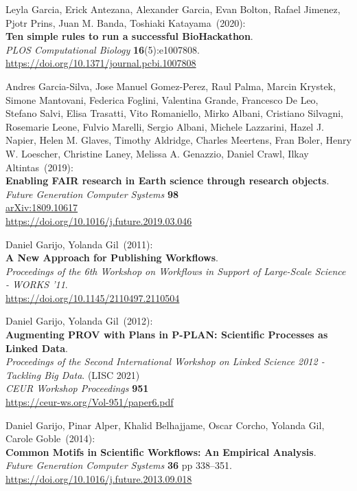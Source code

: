 \begin{thebibliography}{9}
Leyla Garcia, Erick Antezana, Alexander Garcia, Evan Bolton, Rafael Jimenez, Pjotr Prins, Juan M. Banda, Toshiaki Katayama~(2020): \\
\textbf{Ten simple rules to run a successful BioHackathon}. \\
\emph{PLOS Computational Biology} \textbf{16}(5):e1007808.\\
\url{https://doi.org/10.1371/journal.pcbi.1007808}

Andres Garcia-Silva, Jose Manuel Gomez-Perez, Raul Palma, Marcin Krystek, Simone Mantovani, Federica Foglini, Valentina Grande, Francesco De Leo, Stefano Salvi, Elisa Trasatti, Vito Romaniello, Mirko Albani, Cristiano Silvagni, Rosemarie Leone, Fulvio Marelli, Sergio Albani, Michele Lazzarini, Hazel J. Napier, Helen M. Glaves, Timothy Aldridge, Charles Meertens, Fran Boler, Henry W. Loescher, Christine Laney, Melissa A. Genazzio, Daniel Crawl, Ilkay Altintas~(2019): \\
\textbf{Enabling FAIR research in Earth science through research objects}.\\
\emph{Future Generation Computer Systems} \textbf{98} \\
\href{https://doi.org/10.48550/arXiv.1809.10617}{arXiv:1809.10617} \\
\url{https://doi.org/10.1016/j.future.2019.03.046}

Daniel Garijo, Yolanda Gil~(2011): \\
\textbf{A New Approach for Publishing Workflows}.\\
\emph{Proceedings of the 6th Workshop on Workflows in Support of Large-Scale Science - WORKS '11}.\\
\url{https://doi.org/10.1145/2110497.2110504}

 Daniel Garijo, Yolanda Gil~(2012): \\
\textbf{Augmenting PROV with Plans in P-PLAN: Scientific Processes as Linked Data}.\\
\emph{Proceedings of the Second International Workshop on Linked Science 2012 - Tackling Big Data}. (LISC 2021)\\
\emph{CEUR Workshop Proceedings} \textbf{951}\\
\url{https://ceur-ws.org/Vol-951/paper6.pdf}

Daniel Garijo, Pinar Alper, Khalid Belhajjame, Oscar Corcho, Yolanda Gil, Carole Goble~(2014): \\
\textbf{Common Motifs in Scientific Workflows: An Empirical Analysis}.\\
\emph{Future Generation Computer Systems} \textbf{36} pp 338--351.\\
\url{https://doi.org/10.1016/j.future.2013.09.018}


\end{thebibliography}
